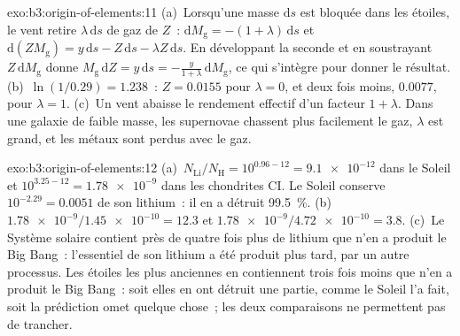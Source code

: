 \begin{solution}{exo:b3:origin-of-elements:11}
(a)~Lorsqu'une masse $\mathrm{d}s$ est bloquée dans les étoiles, le vent retire
$\lambda\,\mathrm{d}s$ de gaz de  $Z$~:
$\mathrm{d}M_\mathrm{g} = -(1 + \lambda)\,\mathrm{d}s$ et
$\mathrm{d}(ZM_\mathrm{g}) = y\,\mathrm{d}s - Z\,\mathrm{d}s -
\lambda Z\,\mathrm{d}s$. En développant la seconde et en soustrayant
$Z\,\mathrm{d}M_\mathrm{g}$ donne $M_\mathrm{g}\,\mathrm{d}Z =
y\,\mathrm{d}s = -\frac{y}{1 + \lambda}\,\mathrm{d}M_\mathrm{g}$, ce qui
s'intègre pour donner le résultat. (b)~$\ln(1/0.29) = 1.238$~: $Z = 0.0155$ pour
$\lambda = 0$, et deux fois moins, $0.0077$, pour $\lambda = 1$. (c)~Un vent
abaisse le rendement effectif d'un facteur $1 + \lambda$. Dans une galaxie de
faible masse, les supernovae chassent plus facilement le gaz, $\lambda$ est grand,
et les métaux sont perdus avec le gaz.
\end{solution}

\begin{solution}{exo:b3:origin-of-elements:12}
(a)~$N_\mathrm{Li}/N_\mathrm{H} = 10^{0.96 - 12} = \num{9.1e-12}$ dans le
Soleil et $10^{3.25 - 12} = \num{1.78e-9}$ dans les chondrites CI. Le Soleil
conserve $10^{-2.29} = \num{0.0051}$ de son lithium~: il en a détruit
\qty{99.5}{\percent}. (b)~$\num{1.78e-9}/\num{1.45e-10} = 12.3$ et
$\num{1.78e-9}/\num{4.72e-10} = 3.8$. (c)~Le Système solaire contient près de
quatre fois plus de lithium que n'en a produit le Big Bang~: l'essentiel de son lithium a été
produit plus tard, par un autre processus. Les étoiles les plus anciennes en contiennent trois fois
moins que n'en a produit le Big Bang~: soit elles en ont détruit une partie, comme
le Soleil l'a fait, soit la prédiction omet quelque chose~; les deux comparaisons
ne permettent pas de trancher.
\end{solution}

